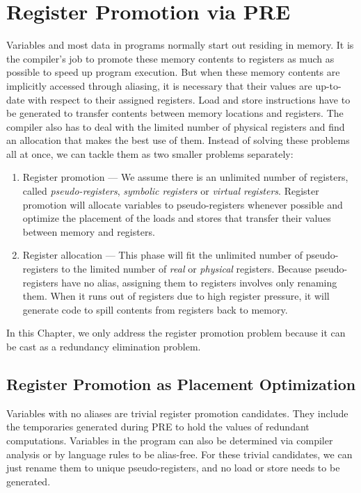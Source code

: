\section{Register Promotion via PRE}

Variables and most data in programs normally start out residing in memory.
It is the compiler's job to promote these memory contents to registers as
much as possible to speed up program execution.  But when these memory contents 
are implicitly accessed through aliasing, it is necessary that their values
are up-to-date with respect to their assigned registers.  Load and store
instructions have to be generated to transfer contents between memory locations
and registers.  The compiler also has to deal with the limited number of 
physical registers and find an allocation that makes the best use of them.  
Instead of solving these problems all at once, we can tackle them as two
smaller problems separately:
\begin{enumerate}
\item Register promotion --- We assume there is an unlimited number of 
registers, called \emph{pseudo-registers}, \emph{symbolic registers} or 
\emph{virtual registers}. Register promotion will allocate variables to
pseudo-registers whenever possible and optimize the placement of the loads
and stores that transfer their values between memory and registers.
\item Register allocation --- This phase will fit the unlimited number of
pseudo-registers to the limited number of \emph{real} or \emph{physical}
registers.  Because pseudo-registers have no alias, assigning them to registers
involves only renaming them.  When it runs out of registers due to high
register pressure, it will generate code to spill contents from registers
back to memory.
\end{enumerate}

In this Chapter, we only address the register promotion problem because it can
be cast as a redundancy elimination problem.

\subsection{Register Promotion as Placement Optimization}

Variables with no aliases are trivial register promotion candidates.  They
include the temporaries generated during PRE to hold the values of redundant 
computations.  Variables in the program can also be determined via compiler
analysis or by language rules to be alias-free.  For these trivial candidates,
we can just rename them to unique pseudo-registers, and no load or store needs
to be generated.  

